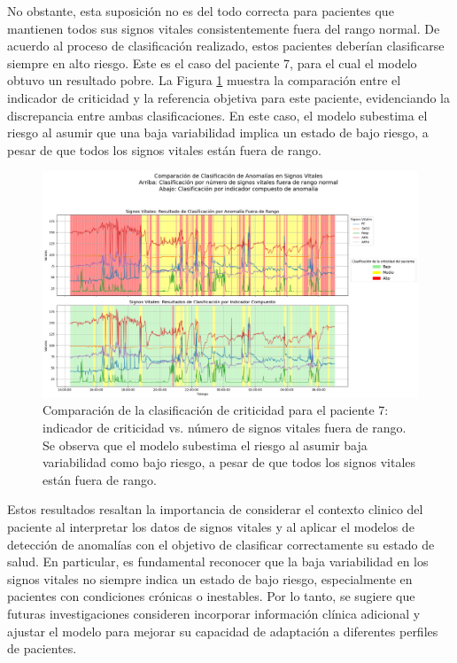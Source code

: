 No obstante, esta suposición no es del todo correcta para pacientes que mantienen todos sus signos vitales consistentemente fuera del rango normal. De acuerdo al proceso de clasificación realizado, estos pacientes deberían clasificarse siempre en alto riesgo. Este es el caso del paciente 7, para el cual el modelo obtuvo un resultado pobre. La Figura \ref{fig:comparacion_clasificacion_paciente7} muestra la comparación entre el indicador de criticidad y la referencia objetiva para este paciente, evidenciando la discrepancia entre ambas clasificaciones. En este caso, el modelo subestima el riesgo al asumir que una baja variabilidad implica un estado de bajo riesgo, a pesar de que todos los signos vitales están fuera de rango.

\begin{figure}[ht]
  \centering
  \includegraphics[width=\textwidth]{Images/comparacion_indicador_con_fuera_de_rango_paciente_7.png}
  \caption{Comparación de la clasificación de criticidad para el paciente 7: indicador de criticidad vs. número de signos vitales fuera de rango. Se observa que el modelo subestima el riesgo al asumir baja variabilidad como bajo riesgo, a pesar de que todos los signos vitales están fuera de rango.}
  \label{fig:comparacion_clasificacion_paciente7}
\end{figure}

Estos resultados resaltan la importancia de considerar el contexto clinico del paciente al interpretar los datos de signos vitales y al aplicar el modelos de detección de anomalías con el objetivo de clasificar correctamente su estado de salud. En particular, es fundamental reconocer que la baja variabilidad en los signos vitales no siempre indica un estado de bajo riesgo, especialmente en pacientes con condiciones crónicas o inestables. Por lo tanto, se sugiere que futuras investigaciones consideren incorporar información clínica adicional y ajustar el modelo para mejorar su capacidad de adaptación a diferentes perfiles de pacientes.


